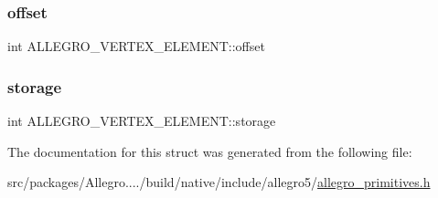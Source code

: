 \subsubsection{\texorpdfstring{offset}{offset}}
{\footnotesize\ttfamily int A\+L\+L\+E\+G\+R\+O\+\_\+\+V\+E\+R\+T\+E\+X\+\_\+\+E\+L\+E\+M\+E\+N\+T\+::offset}

\mbox{\label{struct_a_l_l_e_g_r_o___v_e_r_t_e_x___e_l_e_m_e_n_t_ad30237fb8a351163f894e75081bf0c1a}} 
\subsubsection{\texorpdfstring{storage}{storage}}
{\footnotesize\ttfamily int A\+L\+L\+E\+G\+R\+O\+\_\+\+V\+E\+R\+T\+E\+X\+\_\+\+E\+L\+E\+M\+E\+N\+T\+::storage}



The documentation for this struct was generated from the following file\+:\begin{DoxyCompactItemize}
\item 
src/packages/\+Allegro..../build/native/include/allegro5/\hyperlink{allegro__primitives_8h}{allegro\+\_\+primitives.\+h}\end{DoxyCompactItemize}
